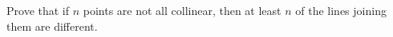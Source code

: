 Prove that if $n$ points are not all collinear, then at least $n$ of the lines joining them are different.

